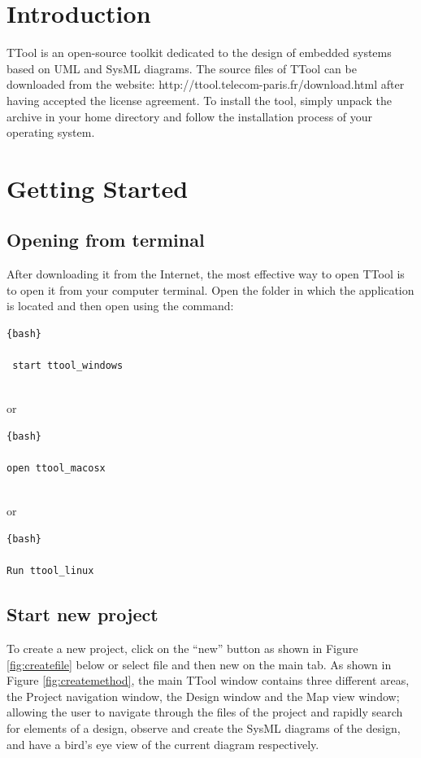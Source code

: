 \documentclass[12pt]{article}
\begin{document}
\newpage
\section{Introduction}

TTool is an open-source toolkit dedicated to the design of embedded systems based on UML and SysML diagrams. The source files of TTool can be downloaded from the website: http://ttool.telecom-paris.fr/download.html
after having accepted the license agreement. To install the tool, simply unpack the archive in your home directory and follow the installation process of your operating system.

\section{Getting Started}
\subsection{Opening from terminal}

After downloading it from the Internet, the most effective way to open TTool is to open it from your computer terminal. Open the folder in which the application is located and then open using the command:
\begin{lstlisting}{bash}

 start ttool_windows
 

\end{lstlisting}

or 
\begin{lstlisting}{bash}

open ttool_macosx
 

\end{lstlisting}

or \begin{lstlisting}{bash}

Run ttool_linux

\end{lstlisting}


\subsection{Start new project}
To create a new project, click on the “new” button as shown in Figure \ref{fig:createfile} below or select file and then new on the main tab. As shown in Figure \ref{fig:createmethod}, the main TTool window contains three different areas, the Project navigation window, the Design window and the Map view window; allowing the user to navigate through the files of the project and rapidly search for elements of a design, observe and create the SysML diagrams of the design, and have a bird’s eye view of the current diagram respectively.
\end{document}
